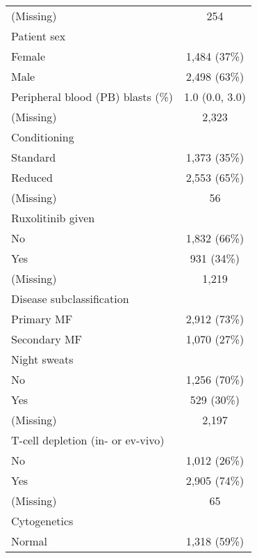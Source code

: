 \documentclass[
  12pt,
  a4paper,
]{article}
\begin{document}
\begin{longtable}[t]{lc}
\hspace{1em}(Missing) & 254\\
Patient sex & \\
\hspace{1em}Female & 1,484 (37\%)\\
\hspace{1em}Male & 2,498 (63\%)\\
Peripheral blood (PB) blasts (\%) & 1.0 (0.0, 3.0)\\
\hspace{1em}(Missing) & 2,323\\
Conditioning & \\
\hspace{1em}Standard & 1,373 (35\%)\\
\hspace{1em}Reduced & 2,553 (65\%)\\
\hspace{1em}(Missing) & 56\\
Ruxolitinib given & \\
\hspace{1em}No & 1,832 (66\%)\\
\hspace{1em}Yes & 931 (34\%)\\
\hspace{1em}(Missing) & 1,219\\
Disease subclassification & \\
\hspace{1em}Primary MF & 2,912 (73\%)\\
\hspace{1em}Secondary MF & 1,070 (27\%)\\
Night sweats & \\
\hspace{1em}No & 1,256 (70\%)\\
\hspace{1em}Yes & 529 (30\%)\\
\hspace{1em}(Missing) & 2,197\\
T-cell depletion (in- or ev-vivo) & \\
\hspace{1em}No & 1,012 (26\%)\\
\hspace{1em}Yes & 2,905 (74\%)\\
\hspace{1em}(Missing) & 65\\
Cytogenetics & \\
\hspace{1em}Normal & 1,318 (59\%)\\

\end{longtable}
\end{document}
